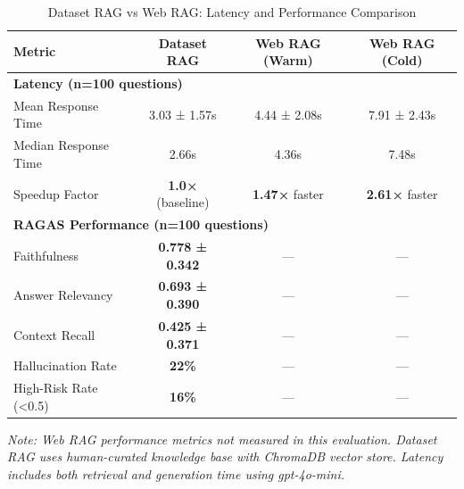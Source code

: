 
\begin{table}[!t]
\centering
\caption{Dataset RAG vs Web RAG: Latency and Performance Comparison}
\label{tab:dataset_web_rag_comparison}
\begin{tabular}{|l|c|c|c|}
\hline
\textbf{Metric} & \textbf{Dataset RAG} & \textbf{Web RAG (Warm)} & \textbf{Web RAG (Cold)} \\
\hline
\hline
\multicolumn{4}{|l|}{\textbf{Latency (n=100 questions)}} \\
\hline
Mean Response Time & 3.03 ± 1.57s & 4.44 ± 2.08s & 7.91 ± 2.43s \\
Median Response Time & 2.66s & 4.36s & 7.48s \\
Speedup Factor & \textbf{1.0×} (baseline) & \textbf{1.47×} faster & \textbf{2.61×} faster \\
\hline
\hline
\multicolumn{4}{|l|}{\textbf{RAGAS Performance (n=100 questions)}} \\
\hline
Faithfulness & \textbf{0.778 ± 0.342} & — & — \\
Answer Relevancy & \textbf{0.693 ± 0.390} & — & — \\
Context Recall & \textbf{0.425 ± 0.371} & — & — \\
Hallucination Rate & \textbf{22\%} & — & — \\
High-Risk Rate (<0.5) & \textbf{16\%} & — & — \\
\hline
\end{tabular}

\vspace{0.1cm}
\footnotesize
\textit{Note: Web RAG performance metrics not measured in this evaluation. Dataset RAG uses human-curated knowledge base with ChromaDB vector store. Latency includes both retrieval and generation time using gpt-4o-mini.}
\end{table}

